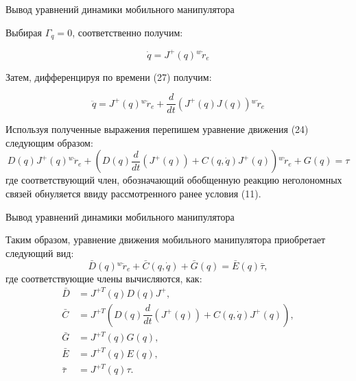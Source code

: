 \documentclass[newPxFont,numfooter,sectionpages]{beamer}
\begin{document}
\begin{frame}{Вывод уравнений динамики мобильного манипулятора }
	\begin{center}
		\begin{minipage}[b]{0.9\textwidth}
		Выбирая $\Gamma_q = 0$, соответственно получим:

\begin{equation}
\dot{q} = J^{+}(q){^w\dot{r}_e}
\tag{27} \label{eq:27}
\end{equation}

Затем, дифференцируя по времени (27) получим:

\begin{equation}
\ddot{q} = J^{+}(q){^w\ddot{r}_e} + \dfrac{d}{dt}\left(J^{+}(q)J(q)\right){^w\dot{r}_e}
\tag{28} \label{eq:28}
\end{equation}

Используя полученные выражения перепишем уравнение движения (24) следующим образом:
\[
    D(q)J^{+}(q){^w\ddot{r}_e} + \left(D(q)\dfrac{d}{dt}\left(J^{+}(q)\right) + C(q,\dot{q})J^{+}(q)\right){^w\dot{r}_e} + G(q) = \tau 
\]
где соответствующий член, обозначающий обобщенную реакцию неголономных связей обнуляется ввиду рассмотренного ранее условия (11).
		\end{minipage}
	\end{center}
\end{frame}

\begin{frame}{Вывод уравнений динамики мобильного манипулятора }
	\begin{center}
		\begin{minipage}[b]{0.9\textwidth}
		Таким образом, уравнение движения мобильного манипулятора приобретает следующий вид:
\[
    \bar{D}(q){^w\ddot{r}_e} + \bar{C}(q,\dot{q}) + \bar{G}(q) = \bar{E}(q)\bar{\tau}, 
	\tag{29} \label{eq:29}
\]
где соответствующие члены вычисляются, как:
\begin{align*}
\bar{D} &= J^{+T}(q){D}(q)J^{+},\\
\bar{C} &= J^{+T}\left(D(q)\dfrac{d}{dt}\left(J^{+}(q)\right) + C(q,\dot{q})J^{+}(q)\right),\\
\bar{G} &= J^{+T}(q)G(q),\\
\bar{E} &= J^{+T}(q)E(q),\\
\bar{\tau} &= J^{+T}(q)\tau.
\end{align*}
		\end{minipage}
	\end{center}
\end{frame}
\end{document}
